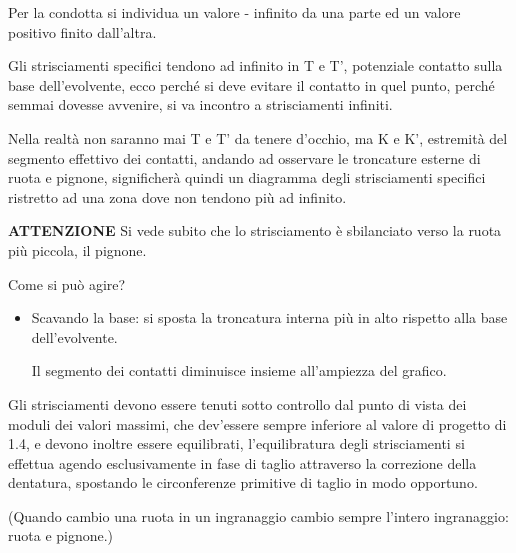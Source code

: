 \documentclass[a4paper, 15pt]{article}
\begin{document}
\begin{adjustwidth}{2in}{}
	Per la condotta si individua un valore - infinito da una parte  ed un valore positivo finito dall'altra.
	
	Gli strisciamenti specifici tendono ad infinito in T e T', potenziale contatto sulla base dell'evolvente, ecco perché si deve evitare il contatto in quel punto, perché semmai dovesse avvenire, si va incontro a strisciamenti infiniti. 
	
	Nella realtà non saranno mai T e T' da tenere d'occhio, ma K e K', estremità del segmento effettivo dei contatti, andando ad osservare le troncature esterne di ruota e pignone, significherà quindi un diagramma degli strisciamenti specifici ristretto ad una zona dove non tendono più ad infinito. 
	
	\textbf{ATTENZIONE} Si vede subito che lo strisciamento è sbilanciato verso la ruota più piccola, il pignone. 
	
	Come si può agire? 
	
	\begin{itemize}
		\item Scavando la base: si sposta la troncatura interna più in alto rispetto alla base dell'evolvente. 
		
		Il segmento dei contatti diminuisce insieme all'ampiezza del grafico. 
	\end{itemize}
	
	Gli strisciamenti devono essere tenuti sotto controllo dal punto di vista dei moduli dei valori massimi, che dev'essere sempre inferiore al valore di progetto di 1.4, e devono inoltre essere equilibrati, l'equilibratura degli strisciamenti si effettua agendo esclusivamente in fase di taglio attraverso la correzione della dentatura, spostando le circonferenze primitive di taglio in modo opportuno.  	
	
	(Quando cambio una ruota in un ingranaggio cambio sempre l'intero ingranaggio: ruota e pignone.) 
	
	
	
	
	
	
	
		
	
		
		
		
		
		
		 
		
		   
		
		
		
		

	   
	   
	   
	   
	   
	   

\end{adjustwidth}
\end{document}
